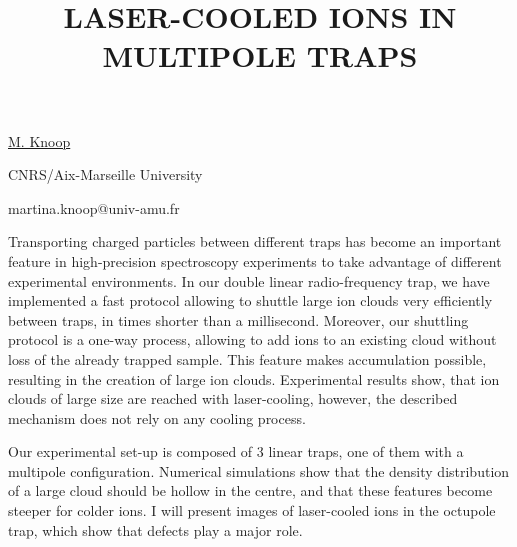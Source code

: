 \title{LASER-COOLED IONS IN MULTIPOLE TRAPS}

\underline{M. Knoop} 

{\normalsize{\vspace{-4mm}
CNRS/Aix-Marseille University

\email martina.knoop@univ-amu.fr}}

Transporting charged particles between different traps has become an important feature in high-precision spectroscopy experiments to take advantage of different experimental environments. In our double linear radio-frequency trap, we have implemented a fast protocol allowing to shuttle large ion clouds very efficiently between traps, in times shorter than a millisecond. Moreover, our shuttling protocol is a  one-way process, allowing to add ions to an existing cloud without loss of the already trapped sample. This feature makes  accumulation possible, resulting in the creation of large ion clouds. Experimental results show, that ion clouds of large size are reached with laser-cooling, however, the described mechanism does not rely on any cooling process.

Our experimental set-up is composed of 3 linear traps, one of them with a multipole configuration. Numerical simulations show that the density distribution of a large cloud should be hollow in the centre, and that these features become steeper for colder ions. I will present images of laser-cooled ions in the octupole trap, which show that defects play a major role.

%
%



\vspace{\baselineskip} 